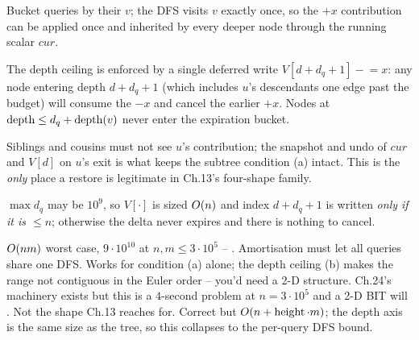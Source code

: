 \begin{observation}
Bucket queries by their $v$; the DFS visits $v$ exactly once, so the
$+x$ contribution can be applied once and inherited by every deeper
node through the running scalar $\mathit{cur}$.
\end{observation}
\begin{observation}
The depth ceiling is enforced by a single deferred write
$\mathit{V}[d+d_q+1]\mathrel{-}=x$: any node entering depth
$d+d_q+1$ (which includes $u$'s descendants one edge past the budget)
will consume the $-x$ and cancel the earlier $+x$. Nodes at
$\operatorname{depth} \le d_q + \operatorname{depth}(v)$ never enter the expiration bucket.
\end{observation}
\begin{observation}
Siblings and cousins must not see $u$'s contribution; the snapshot and
undo of $\mathit{cur}$ and $\mathit{V}[d]$ on $u$'s exit is what keeps
the subtree condition (a) intact. This is the \emph{only} place a
restore is legitimate in Ch.13's four-shape family.
\end{observation}
\begin{observation}
$\max d_q$ may be $10^{9}$, so $\mathit{V}[\cdot]$ is sized $O(n)$
and index $d + d_q + 1$ is written \emph{only if it is $\le n$};
otherwise the delta never expires and there is nothing to cancel.
\end{observation}

\begin{thinkbox}
{$O(nm)$ worst case, $9\cdot 10^{10}$ at $n,m\le 3\cdot 10^{5}$ --
\tle. Amortisation must let all queries share one DFS.}
{Works for condition (a) alone; the depth ceiling (b) makes the range
not contiguous in the Euler order -- you'd need a 2-D structure.
Ch.24's  machinery exists but this is a $4$-second problem
at $n=3\cdot 10^{5}$ and a 2-D BIT will \mle. Not the shape Ch.13
reaches for.}
{Correct but $O(n + \operatorname{height} \cdot m)$; the depth axis is the same
size as the tree, so this collapses to the per-query DFS bound.}
\end{thinkbox}

